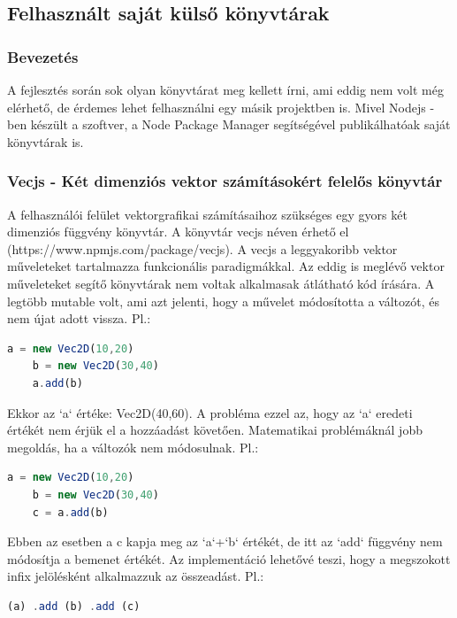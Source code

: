 \documentclass[a4paper,12pt,oneside]{report}
\begin{document}
\subsection{Felhasznált saját külső könyvtárak}
\subsubsection{Bevezetés}

\begin{justify}

	A fejlesztés során sok olyan könyvtárat meg kellett írni, ami eddig nem volt még elérhető, de érdemes lehet felhasználni egy másik projektben is. Mivel Nodejs -ben készült a szoftver, a Node Package Manager segítségével publikálhatóak saját könyvtárak is.


\end{justify}
\newpage
\subsubsection{Vecjs - Két dimenziós vektor számításokért felelős könyvtár}

\begin{justify}

	A felhasználói felület vektorgrafikai számításaihoz szükséges egy gyors két dimenziós függvény könyvtár. A könyvtár vecjs néven érhető el (https://www.npmjs.com/package/vecjs). A vecjs a leggyakoribb vektor műveleteket tartalmazza funkcionális paradigmákkal. Az eddig is meglévő vektor műveleteket segítő könyvtárak nem voltak alkalmasak átlátható kód írására. A legtöbb mutable volt, ami azt jelenti, hogy a művelet módosította a változót, és nem újat adott vissza. Pl.:

	\begin{lstlisting}[language=javascript]
	a = new Vec2D(10,20)
	b = new Vec2D(30,40)
	a.add(b)
	\end{lstlisting}

	Ekkor az `a` értéke: Vec2D(40,60). A probléma ezzel az, hogy az `a` eredeti értékét nem érjük el a hozzáadást követően. Matematikai problémáknál jobb megoldás, ha a változók nem módosulnak. Pl.:

	\begin{lstlisting}[language=javascript]
	a = new Vec2D(10,20)
	b = new Vec2D(30,40)
	c = a.add(b)
	\end{lstlisting}

	Ebben az esetben a c kapja meg az `a`+`b` értékét, de itt az `add` függvény nem módosítja a bemenet értékét. Az implementáció lehetővé teszi, hogy a megszokott infix jelölésként alkalmazzuk az összeadást. Pl.:

	\begin{lstlisting}[language=javascript]
	(a) .add (b) .add (c)
	\end{lstlisting}

\end{justify}
\newpage
\end{document}
